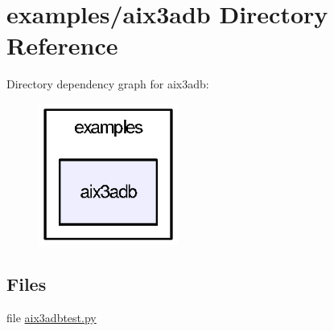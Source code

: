 \section{examples/aix3adb Directory Reference}
\label{dir_0d9b7320eca28c6cc809bcd86084f576}
Directory dependency graph for aix3adb\-:
\nopagebreak
\begin{figure}[H]
\begin{center}
\leavevmode
\includegraphics[width=130pt]{dir_0d9b7320eca28c6cc809bcd86084f576_dep}
\end{center}
\end{figure}
\subsection*{Files}
\begin{DoxyCompactItemize}
\item 
file \hyperlink{aix3adbtest_8py}{aix3adbtest.\-py}
\end{DoxyCompactItemize}

